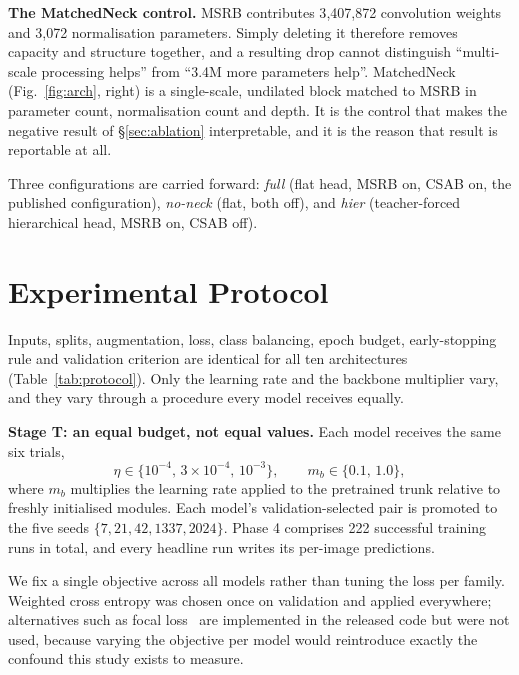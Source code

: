 \documentclass[10pt,journal]{IEEEtran}
\begin{document}
\textbf{The MatchedNeck control.} MSRB contributes 3{,}407{,}872 convolution weights and
3{,}072 normalisation parameters. Simply deleting it therefore removes capacity and structure
together, and a resulting drop cannot distinguish ``multi-scale processing helps'' from
``3.4M more parameters help''. MatchedNeck (Fig.~\ref{fig:arch}, right) is a single-scale,
undilated block matched to MSRB in parameter count, normalisation count and depth. It is the
control that makes the negative result of \S\ref{sec:ablation} interpretable, and it is the
reason that result is reportable at all.

Three configurations are carried forward: \emph{full} (flat head, MSRB on, CSAB on, the
published configuration), \emph{no-neck} (flat, both off), and \emph{hier} (teacher-forced
hierarchical head, MSRB on, CSAB off).

\section{Experimental Protocol}\label{sec:protocol}
Inputs, splits, augmentation, loss, class balancing, epoch budget, early-stopping rule and
validation criterion are identical for all ten architectures (Table~\ref{tab:protocol}). Only
the learning rate and the backbone multiplier vary, and they vary through a procedure every
model receives equally.



\textbf{Stage T: an equal budget, not equal values.} Each model receives the same six trials,
\begin{equation}
\eta\in\{10^{-4},\,3\!\times\!10^{-4},\,10^{-3}\},\qquad m_b\in\{0.1,\,1.0\},
\end{equation}
where $m_b$ multiplies the learning rate applied to the pretrained trunk relative to freshly
initialised modules. Each model's validation-selected pair is promoted to the five seeds
$\{7,21,42,1337,2024\}$. Phase 4 comprises 222 successful training runs in total, and every
headline run writes its per-image predictions.

We fix a single objective across all models rather than tuning the loss per family. Weighted
cross entropy was chosen once on validation and applied everywhere; alternatives such as
focal loss~\cite{lin2017focal} are implemented in the released code but were not used,
because varying the objective per model would reintroduce exactly the confound this study
exists to measure.
\end{document}
